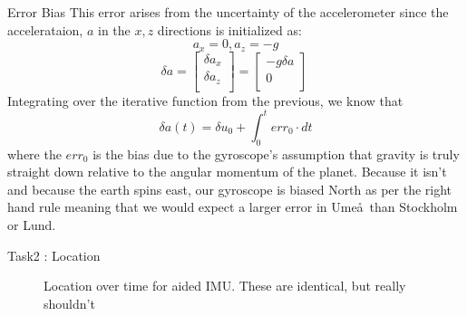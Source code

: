 \documentclass[10pt]{beamer}
\theoremstyle{definition}
\begin{document}
\begin{frame}{Error Bias}
    This error arises from the uncertainty of the accelerometer since the accelerataion, $a$ in the $x,z$ directions is initialized as:
    $$
    a_x = 0, a_z = -g
    $$
    $$
    \delta a = 
    \begin{bmatrix}
        \delta a_x \\
        \delta a_z \\
    \end{bmatrix} = 
    \begin{bmatrix} 
        -g \delta a \\
        0           \\
    \end{bmatrix}
    \
    $$
    Integrating over the iterative function from the previous, we know that
    $$
    \delta a(t) = \delta u_0 + \int_0^t err_0 \cdot dt
    $$
    where the $err_0$ is the bias due to the gyroscope's assumption that gravity is truly straight down relative to the angular momentum of the planet. Because it isn't and because the earth spins east, our gyroscope is biased North as per the right hand rule meaning that we would expect a larger error in Ume\aa~than Stockholm or Lund.
\end{frame}
\begin{frame}{Task2 : Location}
\begin{figure}

    \caption{Location over time for aided IMU. These are identical, but really shouldn't }
    
\end{figure}
\begin{figure}
    
\end{figure}

\end{frame}
\end{document}
